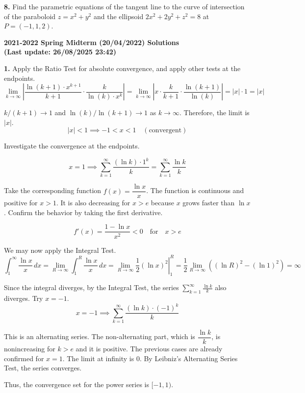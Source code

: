 \documentclass{article}
\begin{document}
\vspace{1em}

\textbf{8.} Find the parametric equations of the tangent line to the curve of intersection of the paraboloid $z=x^2+y^2$ and the ellipsoid $2x^2+2y^2+z^2=8$ at $P=(-1,1,2)$.

\newpage

\begin{center}
\textbf{2021-2022 Spring Midterm (20/04/2022) Solutions\\
(Last update: 26/08/2025 23:42)}
\end{center}

\textbf{1.} Apply the Ratio Test for absolute convergence, and apply other tests at the endpoints.
\[\lim_{k\to\infty}\left|\frac{\ln(k+1)\cdot x^{k+1}}{k+1}\cdot\frac k{\ln(k)\cdot x^k}\right|=\lim_{k\to\infty}\left|x\cdot\frac{k}{k+1}\cdot\frac{\ln(k+1)}{\ln(k)}\right|=|x|\cdot1=|x|\]

$k/(k+1)\to1$ and $\ln(k)/\ln(k+1)\to1$ as $k\to\infty$. Therefore, the limit is $|x|$.
\[|x|<1\implies-1<x<1\quad(\text{convergent})\]

Investigate the convergence at the endpoints.

\[x=1\implies \sum_{k=1}^{\infty}\frac{(\ln k)\cdot 1^k}{k}=\sum_{k=1}^{\infty}\frac{\ln k}{k}\]

Take the corresponding function $f(x)=\dfrac{\ln x}x$. The function is continuous and positive for $x>1$. It is also decreasing for $x>{e}$ because $x$ grows faster than $\ln x$. Confirm the behavior by taking the first derivative.

\[f'(x)=\frac{1-\ln x}{x^2}<0\quad\text{for}\quad x> e\]

We may now apply the Integral Test.
\[\int_1^{\infty}\frac{\ln x}x\,dx=\lim_{R\to\infty}\int_1^R\frac{\ln x}x\,dx=\lim_{R\to\infty}\left.\frac12\left(\ln x\right)^2\right|_1^R=\frac12\lim_{R\to\infty}\left((\ln R)^2-(\ln1)^2\right)=\infty\]

Since the integral diverges, by the Integral Test, the series $\displaystyle\sum_{k=1}^{\infty}\frac{\ln k}k$ also diverges. Try $x=-1$.
\[x=-1\implies \sum_{k=1}^{\infty}\frac{(\ln k)\cdot(-1)^k}{k}\]

This is an alternating series. The non-alternating part, which is $\dfrac{\ln k}k$, is nonincreasing for $k>{e}$ and it is positive. The previous cases are already confirmed for $x=1$. The limit at infinity is $0$. By Leibniz's Alternating Series Test, the series converges.

Thus, the convergence set for the power series is $\boxed{[-1,1)}$.
\end{document}
